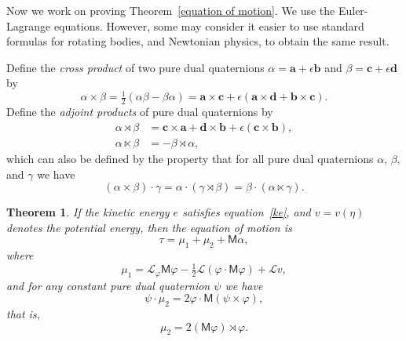 \documentclass[reqno,12pt]{amsart}
\newcommand{\liederiv}{\mathcal L}
\newtheorem{theorem}{Theorem}
\begin{document}
\bigskip

Now we work on proving Theorem~\ref{equation of motion}.  We use the Euler-Lagrange equations.  However, some may consider it easier to use standard formulas for rotating bodies, and Newtonian physics, to obtain the same result.

Define the \emph{cross product} of two pure dual quaternions $\alpha = \bm a + \epsilon \bm b$ and $\beta = \bm c + \epsilon \bm d$ by
\begin{equation}
\alpha \times \beta = \tfrac12(\alpha \beta - \beta \alpha) = \bm a \times \bm c + \epsilon (\bm a \times \bm d + \bm b \times \bm c) .
\end{equation}
Define the \emph{adjoint products} of pure dual quaternions by
\begin{align}
\label{rtimes}
\alpha \rtimes \beta &= \bm c \times \bm a + \bm d \times \bm b + \epsilon (\bm c \times \bm b) ,\\
\alpha \ltimes \beta &= - \beta \rtimes \alpha ,
\end{align}
which can also be defined by the property that for all pure dual quaternions $\alpha$, $\beta$, and $\gamma$ we have
\begin{equation}
(\alpha \times \beta) \cdot \gamma = \alpha \cdot (\gamma \rtimes \beta) = \beta \cdot (\alpha \ltimes \gamma ).
\end{equation}


\begin{theorem}
\label{euler-lagrange}
If the kinetic energy $e$ satisfies equation~\eqref{ke}, and $v = v(\eta)$ denotes the potential energy, then the equation of motion is
\begin{equation}
\label{tau M gamma}
\tau = \mu_1 + \mu_2 + \mathsf M \alpha,
\end{equation}
where
\begin{equation}
\mu_1 = \liederiv_\varphi \mathsf M \varphi - \tfrac12 \liederiv(\varphi \cdot \mathsf M \varphi) + \liederiv v, 
\end{equation}
and for any constant pure dual quaternion $\psi$ we have
\begin{equation}
\psi \cdot \mu_2 = 2 \varphi \cdot \mathsf M (\psi \times \varphi),
\end{equation}
that is,
\begin{equation}
\label{formula mu_2}
\mu_2 = 2 (\mathsf M \varphi) \rtimes \varphi .
\end{equation}
\end{theorem}
\end{document}
